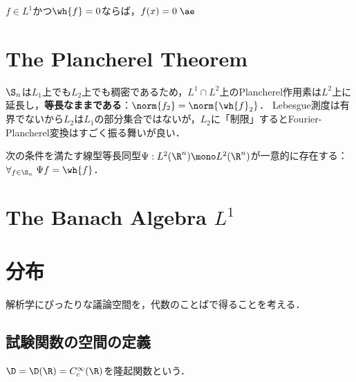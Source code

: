 \documentclass[uplatex,dvipdfmx]{jsreport}
\begin{document}
\begin{theorem}
    $f\in L^1$かつ$\wh{f}=0$ならば，$f(x)=0\;\ae$
\end{theorem}

\section{The Plancherel Theorem}

\begin{tcolorbox}[colframe=ForestGreen, colback=ForestGreen!10!white,breakable,colbacktitle=ForestGreen!40!white,coltitle=black,fonttitle=\bfseries\sffamily,
title=$L^1$に入る前に，$L^2$上での完成された議論を見る]
    $\S_n$は$L_1$上でも$L_2$上でも稠密であるため，$L^1\cap L^2$上のPlancherel作用素は$L^2$上に延長し，\textbf{等長なままである}：$\norm{f_2}=\norm{\wh{f}_2}$．
    Lebesgue測度は有界でないから$L_2$は$L_1$の部分集合ではないが，$L_2$に「制限」するとFourier-Plancherel変換はすごく振る舞いが良い．
\end{tcolorbox}

\begin{theorem}
    次の条件を満たす線型等長同型$\Psi:L^2(\R^n)\mono L^2(\R^n)$が一意的に存在する：$\forall_{f\in\S_n}\;\Psi f=\wh{f}$．
\end{theorem}

\section{The Banach Algebra $L^1$}

\section{分布}

\begin{tcolorbox}[colframe=ForestGreen, colback=ForestGreen!10!white,breakable,colbacktitle=ForestGreen!40!white,coltitle=black,fonttitle=\bfseries\sffamily,
title=]
    解析学にぴったりな議論空間を，代数のことばで得ることを考える．
\end{tcolorbox}

\subsection{試験関数の空間の定義}

\begin{notation}
    $\D=\D(\R)=C_c^\infty(\R)$を隆起関数という．
\end{notation}
\end{document}
